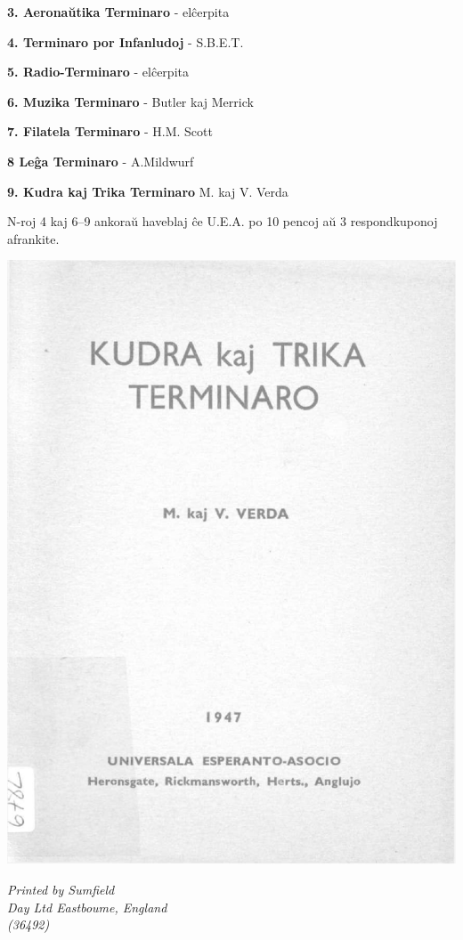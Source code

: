 \textbf{3. Aeronaŭtika Terminaro}		-	elĉerpita

\textbf{4. Terminaro por Infanludoj}		-	S.B.E.T.

\textbf{5. Radio-Terminaro}		-	elĉerpita

\textbf{6. Muzika Terminaro}	-		Butler kaj Merrick

\textbf{7. Filatela Terminaro}	-		H.M. Scott

\textbf{8 Leĝa Terminaro}		-	A.Mildwurf

\textbf{9. Kudra kaj Trika Terminaro}			M. kaj V. Verda

N-roj 4 kaj 6--9 ankoraŭ haveblaj ĉe U.E.A. po 10 pencoj aŭ 3 respondkuponoj afrankite.

\newpage
\begin{center}
			\includegraphics[width=1\textwidth]{titlopagho.pdf}
			\end{center}

\newpage\vspace*{\fill}\begin{center}

\emph{Printed by Sumfield}\\
\emph{Day Ltd Eastboume, England}\\
\emph{(36492)}

\end{center}
\vspace*{\fill}



